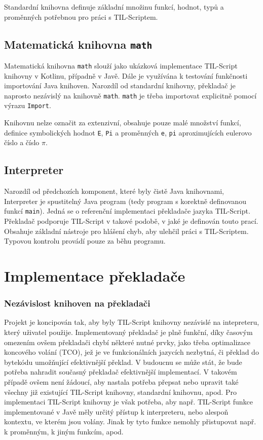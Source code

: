 Standardní knihovna definuje základní množinu funkcí, hodnot, typů a proměnných
potřebnou pro práci s TIL-Scriptem.

\subsection{Matematická knihovna \lstinline{math}}

Matematická knihovna \lstinline{math} slouží jako ukázková implementace
TIL-Script knihovny v Kotlinu, případně v Javě. Dále je využívána k testování
funkčnosti importování Java knihoven. Narozdíl od standardní knihovny, překladač
je naprosto nezávislý na knihovně \lstinline{math}. \lstinline{math} je třeba
importovat explicitně pomocí výrazu \lstinline{Import}.

Knihovnu nelze označit za extenzivní, obsahuje pouze malé množství funkcí,
definice symbolických hodnot \lstinline{E}, \lstinline{Pi} a proměnných
\lstinline{e}, \lstinline{pi} aproximujících eulerovo číslo a číslo $\pi$.

\subsection{Interpreter}

Narozdíl od předchozích komponent, které byly čistě Java knihovnami, Interpreter
je spustitelný Java program (tedy program s korektně definovanou funkcí
\lstinline{main}). Jedná se o referenční implementaci překladače jazyka
TIL-Script. Překladač podporuje TIL-Script v takové podobě, v jaké je definován
touto prací. Obsahuje základní nástroje pro hlášení chyb, aby ulehčil práci
s TIL-Scriptem. Typovou kontrolu provádí pouze za běhu programu.

\section{Implementace překladače}

\subsubsection{Nezávislost knihoven na překladači}

Projekt je koncipován tak, aby byly TIL-Script knihovny nezávislé na intepreteru,
který uživatel použije. Implementovaný překladač je plně funkční, díky časovým
omezením ovšem překladači chybí některé nutné prvky, jako třeba optimalizace
koncového volání (TCO), jež je ve funkcionálních jazycích nezbytná, či překlad
do bytekódu umožňující efektivnější překlad. V budoucnu se může stát, že bude
potřeba nahradit současný překladač efektivnější implementací. V takovém případě
ovšem není žádoucí, aby nastala potřeba přepsat nebo upravit také všechny již
existující TIL-Script knihovny, standardní knihovnu, apod. Pro implementaci
TIL-Script knihovny je však potřeba, aby např. TIL-Script funkce implementované
v Javě měly určitý přístup k interpreteru, nebo alespoň kontextu, ve kterém jsou
volány. Jinak by tyto funkce nemohly přistupovat např. k proměnným, k jiným
funkcím, apod.

\endinput

